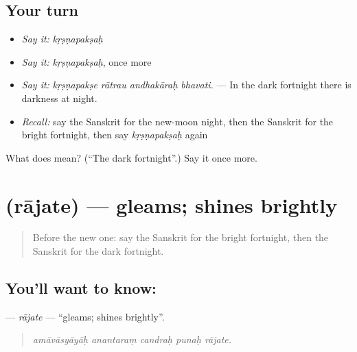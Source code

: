 \subsection*{Your turn}
\begin{itemize}
\raggedright
  \item \emph{Say it:} \emph{kṛṣṇapakṣaḥ}
  \item \emph{Say it:} \emph{kṛṣṇapakṣaḥ}, once more
  \item \emph{Say it:} \emph{kṛṣṇapakṣe rātrau andhakāraḥ bhavati.} — In the dark fortnight there is darkness at night.
  \item \emph{Recall:} say the Sanskrit for the new-moon night, then the Sanskrit for the bright fortnight, then say \emph{kṛṣṇapakṣaḥ} again
\end{itemize}

\begin{tcolorbox}[breakable,colback=teal!4,colframe=teal!35!black,title={Before you move on}]
What does  mean? (\textquotedblleft{}The dark fortnight\textquotedblright{}.) Say it once more.
\end{tcolorbox}
\section[\texorpdfstring{\sk{राजते} (rājate)}{राजते (rājate)}]{ (rājate) — gleams; shines brightly}

\label{lesson:SA-C444-rajate}



\begin{quote}
Before the new one: say the Sanskrit for the bright fortnight, then the Sanskrit for the dark fortnight.
\end{quote}

\subsection*{You'll want to know: }
\textbf{} — \emph{rājate} — \textquotedblleft{}gleams; shines brightly\textquotedblright{}.

\begin{quote}
    
\end{quote}

\begin{quote}
\emph{amāvāsyāyāḥ anantaraṃ candraḥ punaḥ rājate.}
\end{quote}

